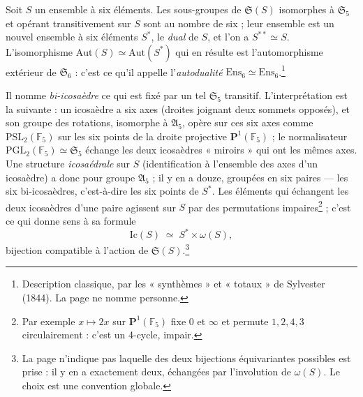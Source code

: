 \documentclass[11pt,a4paper]{article}
\begin{document}
Soit $S$ un ensemble à six éléments. Les sous-groupes de $\mathfrak{S}(S)$
isomorphes à $\mathfrak{S}_5$ et opérant transitivement sur $S$ sont au nombre
de six ; leur ensemble est un nouvel ensemble à six éléments $S^*$, le
\emph{dual} de $S$, et l'on a $S^{**} \simeq S$. L'isomorphisme
$\mathrm{Aut}(S) \simeq \mathrm{Aut}(S^*)$ qui en résulte est l'automorphisme
extérieur de $\mathfrak{S}_6$ : c'est ce qu'il appelle l'\emph{autodualité}
$\mathrm{Ens}_6 \simeq \mathrm{Ens}_6$.\footnote{Description classique,
par les « synthèmes » et « totaux » de Sylvester (1844). La page ne nomme
personne.}

Il nomme \emph{bi-icosaèdre} ce qui est fixé par un tel $\mathfrak{S}_5$
transitif. L'interprétation est la suivante : un icosaèdre a six axes
(droites joignant deux sommets opposés), et son groupe des rotations,
isomorphe à $\mathfrak{A}_5$, opère sur ces six axes comme
$\mathrm{PSL}_2(\mathbb{F}_5)$ sur les six points de la droite projective
$\mathbf{P}^1(\mathbb{F}_5)$ ; le normalisateur
$\mathrm{PGL}_2(\mathbb{F}_5) \simeq \mathfrak{S}_5$ échange les deux
icosaèdres « miroirs » qui ont les mêmes axes. Une structure
\emph{icosaédrale} sur $S$ (identification à l'ensemble des axes d'un
icosaèdre) a donc pour groupe $\mathfrak{A}_5$ ; il y en a douze, groupées en
six paires — les six bi-icosaèdres, c'est-à-dire les six points de $S^*$. Les
éléments qui échangent les deux icosaèdres d'une paire agissent sur $S$ par
des permutations impaires\footnote{Par exemple $x \mapsto 2x$ sur
$\mathbf{P}^1(\mathbb{F}_5)$ fixe $0$ et $\infty$ et permute $1, 2, 4, 3$
circulairement : c'est un 4-cycle, impair.} ; c'est ce qui donne sens à sa
formule
\[
  \mathrm{Ic}(S) \;\simeq\; S^* \times \omega(S) ,
\]
bijection compatible à l'action de $\mathfrak{S}(S)$.\footnote{La page
n'indique pas laquelle des deux bijections équivariantes possibles est prise :
il y en a exactement deux, échangées par l'involution de $\omega(S)$. Le
choix est une convention globale.}
\end{document}
